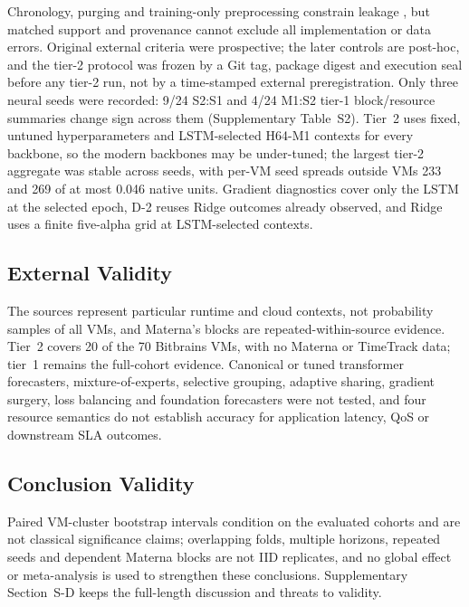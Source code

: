 Chronology, purging and training-only preprocessing constrain leakage
\citep{Cerqueira2020Evaluation,Hyndman2021Forecasting}, but matched support and
provenance cannot exclude all implementation or data errors. Original
external criteria were prospective; the later controls are post-hoc, and the
tier-2 protocol was frozen by a Git tag, package digest and execution seal
before any tier-2 run, not by a time-stamped external preregistration. Only
three neural seeds were recorded: 9/24 S2:S1 and 4/24 M1:S2 tier-1
block/resource summaries change sign across them (Supplementary Table~S2).
Tier~2 uses fixed, untuned hyperparameters and LSTM-selected H64-M1 contexts
for every backbone, so the modern backbones may be under-tuned; the largest
tier-2 aggregate was stable across seeds, with per-VM seed spreads outside
VMs 233 and 269 of at most 0.046 native units. Gradient diagnostics cover
only the LSTM at the selected epoch, D-2 reuses Ridge outcomes already
observed, and Ridge uses a finite five-alpha grid at LSTM-selected contexts.

\subsection{External Validity}
\label{sec:threats-external}

The sources represent particular runtime and cloud contexts, not probability
samples of all VMs, and Materna's blocks are repeated-within-source evidence.
Tier~2 covers 20 of the 70 Bitbrains VMs, with no Materna or TimeTrack data;
tier~1 remains the full-cohort evidence. Canonical or tuned transformer
forecasters, mixture-of-experts, selective grouping, adaptive sharing,
gradient surgery, loss balancing and foundation forecasters were not tested,
and four resource semantics do not establish accuracy for application
latency, QoS or downstream SLA outcomes.

\subsection{Conclusion Validity}
\label{sec:threats-conclusion}

Paired VM-cluster bootstrap intervals condition on the evaluated cohorts and
are not classical significance claims; overlapping folds, multiple horizons,
repeated seeds and dependent Materna blocks are not IID replicates, and no
global effect or meta-analysis is used to strengthen these conclusions.
Supplementary Section~S-D keeps the full-length discussion and threats to
validity.

